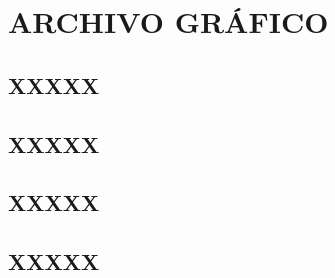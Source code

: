 \section{ARCHIVO GRÁFICO}

\subsection{XXXXX}

\subsection{XXXXX}

\subsection{XXXXX}

\subsection{XXXXX}